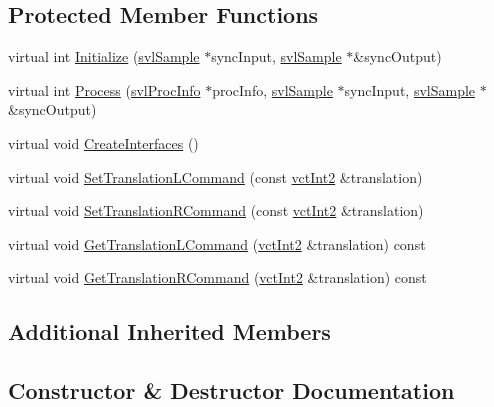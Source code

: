 \subsection*{Protected Member Functions}
\begin{DoxyCompactItemize}
\item 
virtual int \hyperlink{classsvl_filter_image_translation_ac1d4036b6cf799139eafdf40d6d44519}{Initialize} (\hyperlink{classsvl_sample}{svl\+Sample} $\ast$sync\+Input, \hyperlink{classsvl_sample}{svl\+Sample} $\ast$\&sync\+Output)
\item 
virtual int \hyperlink{classsvl_filter_image_translation_ad6db33204e174a7c97155fecb21bf458}{Process} (\hyperlink{structsvl_proc_info}{svl\+Proc\+Info} $\ast$proc\+Info, \hyperlink{classsvl_sample}{svl\+Sample} $\ast$sync\+Input, \hyperlink{classsvl_sample}{svl\+Sample} $\ast$\&sync\+Output)
\item 
virtual void \hyperlink{classsvl_filter_image_translation_abb150819f1baa6186c9cb1c6d051df9f}{Create\+Interfaces} ()
\item 
virtual void \hyperlink{classsvl_filter_image_translation_a9d8cf33e6839cb0c0da9c28b64006b80}{Set\+Translation\+L\+Command} (const \hyperlink{vct_fixed_size_vector_types_8h_add8c88eb6a432b15f14b866b9c35325f}{vct\+Int2} \&translation)
\item 
virtual void \hyperlink{classsvl_filter_image_translation_a2d40a23afdc44babfac98cd5b621d4c8}{Set\+Translation\+R\+Command} (const \hyperlink{vct_fixed_size_vector_types_8h_add8c88eb6a432b15f14b866b9c35325f}{vct\+Int2} \&translation)
\item 
virtual void \hyperlink{classsvl_filter_image_translation_a526bbaf77c15f8dcdce22d9188f26cfd}{Get\+Translation\+L\+Command} (\hyperlink{vct_fixed_size_vector_types_8h_add8c88eb6a432b15f14b866b9c35325f}{vct\+Int2} \&translation) const 
\item 
virtual void \hyperlink{classsvl_filter_image_translation_a0f3d9aca5f8c760ab88f9cecd33f578c}{Get\+Translation\+R\+Command} (\hyperlink{vct_fixed_size_vector_types_8h_add8c88eb6a432b15f14b866b9c35325f}{vct\+Int2} \&translation) const 
\end{DoxyCompactItemize}
\subsection*{Additional Inherited Members}


\subsection{Constructor \& Destructor Documentation}
\hypertarget{classsvl_filter_image_translation_a7c750ac0c96ead87e84ded5cb5f93f23}{}
